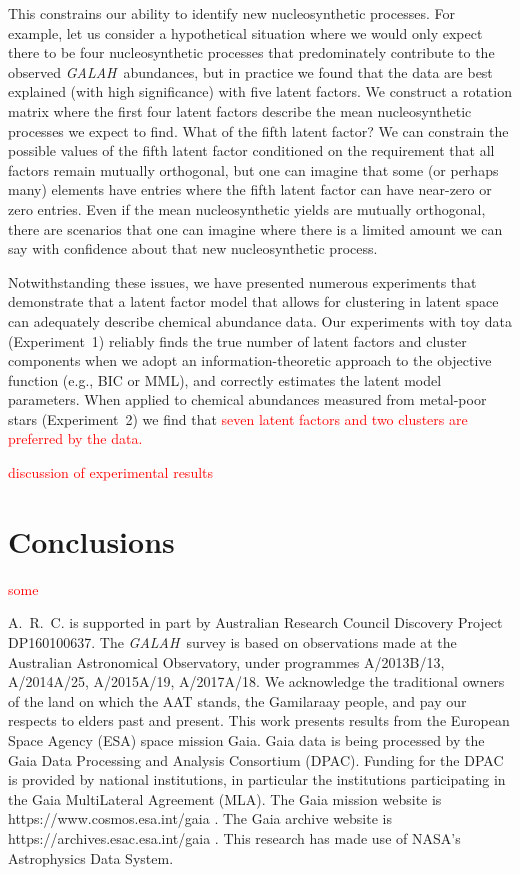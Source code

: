 \documentclass[twocolumn]{aastex62}
\newcommand{\project}[1]{\textsl{#1}}
\newcommand{\GALAH}{\project{GALAH}}
\newcommand{\todo}[1]{\textcolor{red}{#1}}
\begin{document}
This constrains our ability to identify new nucleosynthetic processes. For example,
let us consider a hypothetical situation where we would only expect there to be four 
nucleosynthetic processes that predominately contribute to the observed \GALAH\ abundances,
but in practice we found that the data are best explained (with high significance) with
five latent factors. We construct a rotation matrix where the first four latent factors
describe the mean nucleosynthetic processes we expect to find. What of the fifth latent
factor? We can constrain the possible values of the fifth latent factor conditioned on
the requirement that all factors remain mutually orthogonal, but one can imagine that
some (or perhaps many) elements have entries where the fifth latent factor can have
near-zero or zero entries. Even if the mean nucleosynthetic yields are mutually
orthogonal, there are scenarios that one can imagine where there is a limited amount
we can say with confidence about that new nucleosynthetic process.

Notwithstanding these issues, we have presented numerous experiments that demonstrate
that a latent factor model that allows for clustering in latent space can adequately
describe chemical abundance data. Our experiments with toy data (Experiment~1) reliably
finds the true number of latent factors and cluster components when we adopt an information-theoretic approach to the objective function (e.g., BIC or MML), and correctly estimates the latent
model parameters. When applied to chemical abundances measured from metal-poor stars 
(Experiment~2) we find that \todo{seven latent factors and two clusters are preferred by
the data.}

\todo{discussion of experimental results}

\section{Conclusions} \label{sec:conclusion}

\todo{some}

\acknowledgements
A.~R.~C. is supported in part by Australian Research Council
Discovery Project DP160100637.
The \GALAH\ survey is based on observations made at the Australian Astronomical Observatory, under programmes A/2013B/13,
A/2014A/25, A/2015A/19, A/2017A/18. We acknowledge the traditional owners of the land on which the AAT stands, the Gamilaraay
people, and pay our respects to elders past and present.
This work presents results from the European Space Agency (ESA) space mission Gaia. Gaia data is being processed by the Gaia Data Processing and Analysis Consortium (DPAC). Funding for the DPAC is provided by national institutions, in particular the institutions participating in the Gaia MultiLateral Agreement (MLA). The Gaia mission website is https://www.cosmos.esa.int/gaia . The Gaia archive website is https://archives.esac.esa.int/gaia .
This research has made use of NASA's Astrophysics Data System.
\end{document}
